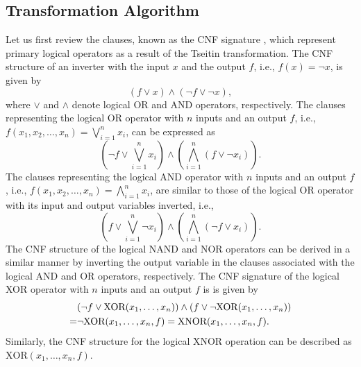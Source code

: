 \subsection{Transformation Algorithm}
Let us first review the clauses, known as the CNF signature \cite{roy2004restoring}, which represent primary logical operators as a result of the Tseitin transformation. The CNF structure of an inverter with the input $x$ and the output $f$, i.e., $f(x) = \neg x$, is given by 
\begin{equation}
    (f \vee x) \wedge (\neg f \vee \neg x), 
\end{equation} 
where $\vee$ and $\wedge$ denote logical OR and AND operators, respectively. The clauses representing the logical OR operator with $n$ inputs and an output $f$, i.e., $f(x_1, x_2, \dots, x_n) = \bigvee_{i=1}^n x_i$, can be expressed as
\begin{equation}
    \left(\neg f \vee \bigvee_{i=1}^n x_i \right) \wedge \left( \bigwedge_{i=1}^n (f \vee \neg x_i) \right).
\end{equation}
The clauses representing the logical AND operator with $n$ inputs and an output $f$, i.e., $f(x_1, x_2, \dots, x_n) = \bigwedge_{i=1}^n x_i$, are similar to those of the logical OR operator with its input and output variables inverted, i.e., 
\begin{equation}
    \left(f \vee \bigvee_{i=1}^n \neg x_i \right) \wedge \left( \bigwedge_{i=1}^n (\neg f \vee x_i) \right).
\end{equation}
The CNF structure of the logical NAND and NOR operators can be derived in a similar manner by inverting the output variable in the clauses associated with the logical AND and OR operators, respectively. The CNF signature of the logical XOR operator with $n$ inputs and an output $f$ is is given by \vspace{-0.2cm}
\begin{align}
    & (\neg f \vee \text{XOR}(x_1, \dots, x_n)) \wedge (f \vee \neg \text{XOR}(x_1, \dots, x_n)) \nonumber \\
    = & \neg \text{XOR}(x_1, \dots, x_n, f) = \text{XNOR}(x_1, \dots, x_n, f).\vspace{-0.2cm}
\end{align}
Similarly, the CNF structure for the logical XNOR operation can be described as $\text{XOR}(x_1, \dots, x_n, f)$.


